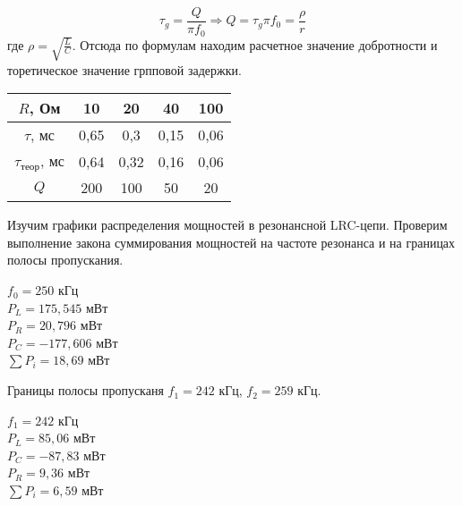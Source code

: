 
	\begin{equation*}
		\tau_g = \frac{Q}{\pi f_0} \Rightarrow Q = \tau_g \pi f_0 = \frac{\rho}{r}
	\end{equation*}
	где $\rho = \sqrt{\frac{L}{C}}$. Отсюда по формулам находим расчетное значение добротности и торетическое значение грпповой задержки.

	\begin{table}[h!]
		\begin{center}
			\begin{tabular}{|c|c|c|c|c|}
				\hline
				$R$, Ом                     & 10    & 20   & 40   & 100  \\ \hline
				$\tau$, мс                  & 0,65  & 0,3  & 0,15 & 0,06 \\ \hline
				$\tau_{\text{теор}}$, мс    & 0,64  & 0,32 & 0,16 & 0,06 \\ \hline
				$Q$                         & 200   & 100  & 50   & 20   \\ \hline
			\end{tabular}
		\end{center}
	\end{table}


	\noindent Изучим графики распределения мощностей в резонансной
	LRC-цепи. Проверим выполнение закона суммирования мощностей на частоте резонанса
	и на границах полосы пропускания.

	\begin{center}
		$f_0 = 250$      кГц   \\
		$P_L = 175,545$  мВт   \\
		$P_R = 20,796$   мВт   \\
		$P_C = -177,606$ мВт   \\
		$\sum P_i = 18,69$ мВт \\
	\end{center}

	\noindent Границы полосы пропусканя $f_1 = 242$ кГц, $f_2 = 259$ кГц.

	\begin{center}
		$f_1 = 242$      кГц   \\
		$P_L = 85,06$  мВт   \\
		$P_C = -87,83$   мВт   \\
		$P_R = 9,36$ мВт   \\
		$\sum P_i = 6,59$ мВт \\
	\end{center}

